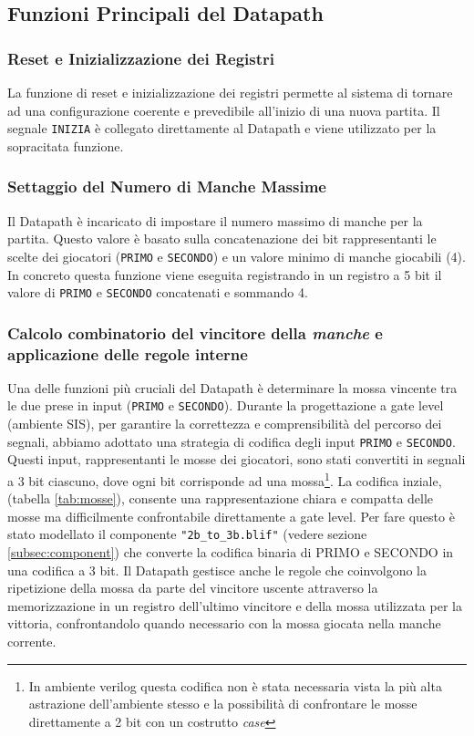 \documentclass[a4paper]{report}
\begin{document}
\subsection{Funzioni Principali del Datapath}

\subsubsection{Reset e Inizializzazione dei Registri}
La funzione di reset e inizializzazione dei registri permette al sistema di tornare ad una configurazione coerente e prevedibile all'inizio di una nuova partita.
Il segnale \texttt{INIZIA} è collegato direttamente al Datapath e viene utilizzato per la sopracitata funzione.

\subsubsection{Settaggio del Numero di Manche Massime}
Il Datapath è incaricato di impostare il numero massimo di manche per la partita.
Questo valore è basato sulla concatenazione dei bit rappresentanti le scelte dei giocatori (\texttt{PRIMO} e \texttt{SECONDO}) e un valore minimo di manche giocabili (4).
In concreto questa funzione viene eseguita registrando in un registro a 5 bit il valore di \texttt{PRIMO} e \texttt{SECONDO} concatenati e sommando 4.

\subsubsection{Calcolo combinatorio del vincitore della \textit{manche} e applicazione delle regole interne}
Una delle funzioni più cruciali del Datapath è determinare la mossa vincente tra le due prese in input (\texttt{PRIMO} e \texttt{SECONDO}).
Durante la progettazione a gate level (ambiente SIS), per garantire la correttezza e comprensibilità del percorso dei segnali, abbiamo adottato una strategia di codifica degli input \texttt{PRIMO} e \texttt{SECONDO}.
Questi input, rappresentanti le mosse dei giocatori, sono stati convertiti in segnali a 3 bit ciascuno, dove ogni bit corrisponde ad una mossa\footnote{In ambiente verilog questa codifica non è stata necessaria vista la più alta astrazione dell'ambiente stesso e la possibilità di confrontare le mosse direttamente a 2 bit con un costrutto \textit{case}}.
La codifica inziale, (tabella \ref{tab:mosse}), consente una rappresentazione chiara e compatta delle mosse ma difficilmente confrontabile direttamente a gate level. Per fare questo è stato modellato il componente \texttt{"2b\_to\_3b.blif"} (vedere sezione \ref{subsec:component}) che converte la codifica binaria di PRIMO e SECONDO in una codifica a 3 bit.
Il Datapath gestisce anche le regole che coinvolgono la ripetizione della mossa da parte del vincitore uscente attraverso la memorizzazione in un registro dell'ultimo vincitore e della mossa utilizzata per la vittoria, confrontandolo quando necessario con la mossa giocata nella manche corrente. 
\end{document}

